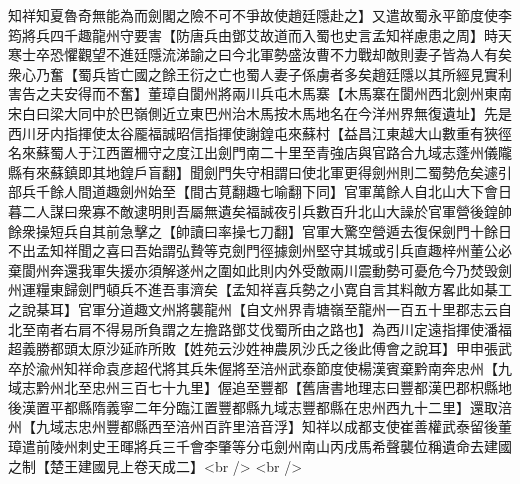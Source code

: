 知祥知夏魯奇無能為而劍閣之險不可不爭故使趙廷隱赴之】又遣故蜀永平節度使李筠將兵四千趣龍州守要害【防唐兵由鄧艾故道而入蜀也史言孟知祥慮患之周】時天寒士卒恐懼觀望不進廷隱流涕諭之曰今北軍勢盛汝曹不力戰却敵則妻子皆為人有矣衆心乃奮【蜀兵皆亡國之餘王衍之亡也蜀人妻子係虜者多矣趙廷隱以其所經見實利害告之夫安得而不奮】董璋自閬州將兩川兵屯木馬寨【木馬寨在閬州西北劍州東南宋白曰梁大同中於巴嶺側近立東巴州治木馬按木馬地名在今洋州界無復遺址】先是西川牙内指揮使太谷龎福誠昭信指揮使謝鍠屯來蘇村【益昌江東越大山數重有狹徑名來蘇蜀人于江西置柵守之度江出劍門南二十里至青強店與官路合九域志蓬州儀隴縣有來蘇鎮即其地鍠戶盲翻】聞劍門失守相謂曰使北軍更得劍州則二蜀勢危矣遽引部兵千餘人間道趣劍州始至【間古莧翻趣七喻翻下同】官軍萬餘人自北山大下會日暮二人謀曰衆寡不敵逮明則吾屬無遺矣福誠夜引兵數百升北山大譟於官軍營後鍠帥餘衆操短兵自其前急擊之【帥讀曰率操七刀翻】官軍大驚空營遁去復保劍門十餘日不出孟知祥聞之喜曰吾始謂弘贄等克劍門徑據劍州堅守其城或引兵直趣梓州董公必棄閬州奔還我軍失援亦須解遂州之圍如此則内外受敵兩川震動勢可憂危今乃焚毁劍州運糧東歸劍門頓兵不進吾事濟矣【孟知祥喜兵勢之小寛自言其料敵方畧此如棊工之說棊耳】官軍分道趣文州將襲龍州【自文州界青塘嶺至龍州一百五十里郡志云自北至南者右肩不得易所負謂之左擔路鄧艾伐蜀所由之路也】為西川定遠指揮使潘福超義勝都頭太原沙延祚所敗【姓苑云沙姓神農夙沙氏之後此傅會之說耳】甲申張武卒於渝州知祥命袁彦超代將其兵朱偓將至涪州武泰節度使楊漢賓棄黔南奔忠州【九域志黔州北至忠州三百七十九里】偓追至豐都【舊唐書地理志曰豐都漢巴郡枳縣地後漢置平都縣隋義寧二年分臨江置豐都縣九域志豐都縣在忠州西九十二里】還取涪州【九域志忠州豐都縣西至涪州百許里涪音浮】知祥以成都支使崔善權武泰留後董璋遣前陵州刺史王暉將兵三千會李肇等分屯劍州南山丙戌馬希聲襲位稱遺命去建國之制【楚王建國見上卷天成二】<br />
<br />
